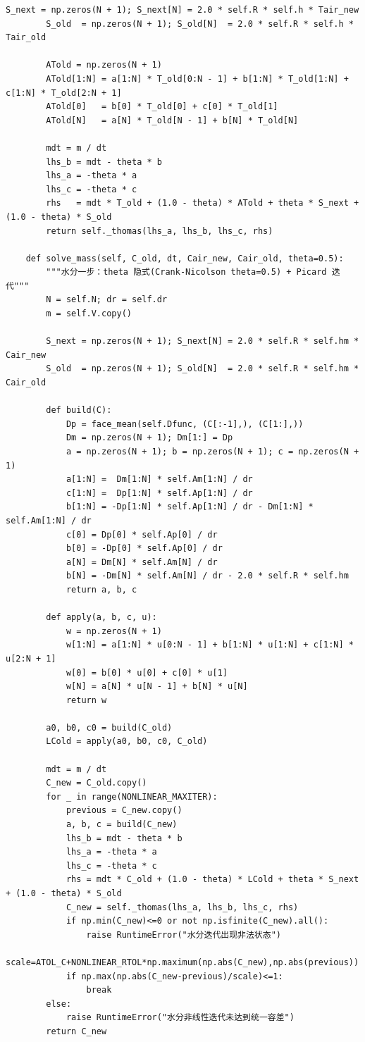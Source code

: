 \documentclass[12pt,a4paper]{ctexart}
\begin{document}
\begin{lstlisting}[caption={solve\_problem1.py }]
        S_next = np.zeros(N + 1); S_next[N] = 2.0 * self.R * self.h * Tair_new
        S_old  = np.zeros(N + 1); S_old[N]  = 2.0 * self.R * self.h * Tair_old

        ATold = np.zeros(N + 1)
        ATold[1:N] = a[1:N] * T_old[0:N - 1] + b[1:N] * T_old[1:N] + c[1:N] * T_old[2:N + 1]
        ATold[0]   = b[0] * T_old[0] + c[0] * T_old[1]
        ATold[N]   = a[N] * T_old[N - 1] + b[N] * T_old[N]

        mdt = m / dt
        lhs_b = mdt - theta * b
        lhs_a = -theta * a
        lhs_c = -theta * c
        rhs   = mdt * T_old + (1.0 - theta) * ATold + theta * S_next + (1.0 - theta) * S_old
        return self._thomas(lhs_a, lhs_b, lhs_c, rhs)

    def solve_mass(self, C_old, dt, Cair_new, Cair_old, theta=0.5):
        """水分一步：theta 隐式(Crank-Nicolson theta=0.5) + Picard 迭代"""
        N = self.N; dr = self.dr
        m = self.V.copy()

        S_next = np.zeros(N + 1); S_next[N] = 2.0 * self.R * self.hm * Cair_new
        S_old  = np.zeros(N + 1); S_old[N]  = 2.0 * self.R * self.hm * Cair_old

        def build(C):
            Dp = face_mean(self.Dfunc, (C[:-1],), (C[1:],))
            Dm = np.zeros(N + 1); Dm[1:] = Dp
            a = np.zeros(N + 1); b = np.zeros(N + 1); c = np.zeros(N + 1)
            a[1:N] =  Dm[1:N] * self.Am[1:N] / dr
            c[1:N] =  Dp[1:N] * self.Ap[1:N] / dr
            b[1:N] = -Dp[1:N] * self.Ap[1:N] / dr - Dm[1:N] * self.Am[1:N] / dr
            c[0] = Dp[0] * self.Ap[0] / dr
            b[0] = -Dp[0] * self.Ap[0] / dr
            a[N] = Dm[N] * self.Am[N] / dr
            b[N] = -Dm[N] * self.Am[N] / dr - 2.0 * self.R * self.hm
            return a, b, c

        def apply(a, b, c, u):
            w = np.zeros(N + 1)
            w[1:N] = a[1:N] * u[0:N - 1] + b[1:N] * u[1:N] + c[1:N] * u[2:N + 1]
            w[0] = b[0] * u[0] + c[0] * u[1]
            w[N] = a[N] * u[N - 1] + b[N] * u[N]
            return w

        a0, b0, c0 = build(C_old)
        LCold = apply(a0, b0, c0, C_old)

        mdt = m / dt
        C_new = C_old.copy()
        for _ in range(NONLINEAR_MAXITER):
            previous = C_new.copy()
            a, b, c = build(C_new)
            lhs_b = mdt - theta * b
            lhs_a = -theta * a
            lhs_c = -theta * c
            rhs = mdt * C_old + (1.0 - theta) * LCold + theta * S_next + (1.0 - theta) * S_old
            C_new = self._thomas(lhs_a, lhs_b, lhs_c, rhs)
            if np.min(C_new)<=0 or not np.isfinite(C_new).all():
                raise RuntimeError("水分迭代出现非法状态")
            scale=ATOL_C+NONLINEAR_RTOL*np.maximum(np.abs(C_new),np.abs(previous))
            if np.max(np.abs(C_new-previous)/scale)<=1:
                break
        else:
            raise RuntimeError("水分非线性迭代未达到统一容差")
        return C_new



\end{lstlisting}
\end{document}
